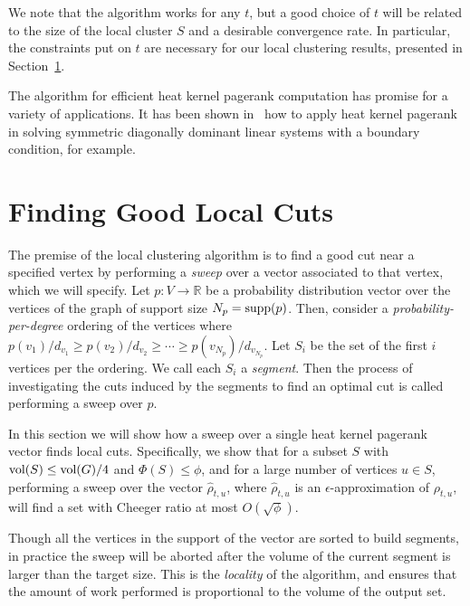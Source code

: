 \documentclass[runningheads,a4paper]{llncs}
\newcommand{\R}{\mathbb{R}}
\newcommand{\vol}{\textmd{vol}}
\newcommand{\supp}{\textmd{supp}}
\begin{document}
\begin{remark}
We note that the algorithm works for any $t$, but a good choice of $t$ will be
related to the size of the local cluster $S$ and a desirable convergence rate.
In particular, the constraints put on $t$ are necessary for our local clustering
results, presented in Section~\ref{sec:goodcuts}.
\end{remark}

The algorithm for efficient heat kernel pagerank computation has promise for a
variety of applications.  It has been shown in~\cite{cs:hklinear:13} how to
apply heat kernel pagerank in solving symmetric diagonally dominant linear
systems with a boundary condition, for example.


\section{Finding Good Local Cuts}
\label{sec:goodcuts}
The premise of the local clustering algorithm is to find a good cut near a
specified vertex by performing a \emph{sweep} over a vector associated to that
vertex, which we will specify.  Let $p:V\rightarrow \R$ be a probability
distribution vector over the vertices of the graph of support size $N_p =
\supp(p)$.  Then, consider a \emph{probability-per-degree} ordering of the
vertices where $p(v_1)/d_{v_1} \geq p(v_2)/d_{v_2} \geq \cdots \geq
p(v_{N_p})/d_{v_{N_p}}$.  Let $S_i$ be the set of the first $i$ vertices per the
ordering.  We call each $S_i$ a \emph{segment}.  Then the process of
investigating the cuts induced by the segments to find an optimal cut is called
performing a sweep over $p$.  

In this section we will show how a sweep over a single heat kernel pagerank
vector finds local cuts.  Specifically, we show that for a subset $S$ with
$\vol(S) \leq \vol(G)/4$ and $\Phi(S) \leq \phi$, and for a large number of
vertices $u\in S$, performing a sweep over the vector $\hat{\rho}_{t,u}$, where
$\hat{\rho}_{t,u}$ is an $\epsilon$-approximation of $\rho_{t,u}$, will find a set with
Cheeger ratio at most $O(\sqrt{\phi})$.

\begin{remark}
Though all the vertices in the support of the vector are sorted to build
segments, in practice the sweep will be aborted after the volume of the current
segment is larger than the target size.  This is the \emph{locality} of the
algorithm, and ensures that the amount of work performed is proportional to the
volume of the output set.
\end{remark}
\end{document}
